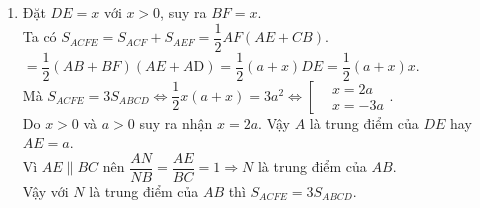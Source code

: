 \begin{ex}
{\begin{enumerate}
			$\triangle CEF$ vuông tại $C$ có $CM$ là đường trung tuyến nên $CM=\dfrac{FE}{2}$,\\ 
			$\triangle AEF$ vuông tại $A$ có $AM$ là đường trung tuyến nên $AM=\dfrac{FE}{2}$.\\
			Suy ra $CM=AM=\dfrac{FE}{2}$. Vậy $M$ thuộc đường trung trực của $AC$.\\ 
			Vì $ABCD$ là hình vuông nên $B$, $D$ thuộc đường trung trực của $AC$.\\
			Vậy $B$, $D$, $M$ thẳng hàng vì cùng thuộc đường trung trực của $AC$, (đpcm).
			\item Đặt $DE=x$ với $x>0$, suy ra $BF=x$.\\ 
			Ta có $S_{ACFE}=S_{ACF}+S_{AEF}=\dfrac{1}{2}AF\left({AE+CB}\right)$.\\
			$=\dfrac{1}{2}\left({AB+BF}\right)\left({AE+A\text{D}}\right)=\dfrac{1}{2}\left({a+x}\right)DE=\dfrac{1}{2}\left({a+x}\right)x$.\\
			Mà $S_{ACFE}=3S_{ABCD}\Leftrightarrow \dfrac{1}{2}x\left({a+x}\right)=3a^2\Leftrightarrow \left[\begin{aligned}& x=2a \\
			& x=-3a 
			\end{aligned}\right.$.\\
			Do $x>0$ và $a>0$ suy ra nhận $x=2a$. Vậy $A$ là trung điểm của $DE$ hay $AE=a$.\\
			Vì $AE\parallel BC$ nên $\dfrac{AN}{NB}=\dfrac{AE}{BC}=1\Rightarrow N$ là trung điểm của $AB$.\\
			Vậy với $N$ là trung điểm của $AB$ thì $S_{ACFE}=3S_{ABCD}$. 
	\end{enumerate}}

\end{ex}

